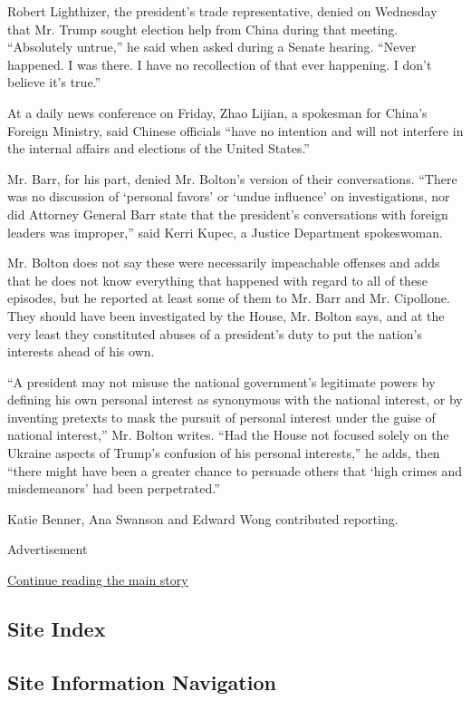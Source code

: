 Robert Lighthizer, the president's trade representative, denied on
Wednesday that Mr. Trump sought election help from China during that
meeting. ``Absolutely untrue,'' he said when asked during a Senate
hearing. ``Never happened. I was there. I have no recollection of that
ever happening. I don't believe it's true.''

At a daily news conference on Friday, Zhao Lijian, a spokesman for
China's Foreign Ministry, said Chinese officials ``have no intention and
will not interfere in the internal affairs and elections of the United
States.''

Mr. Barr, for his part, denied Mr. Bolton's version of their
conversations. ``There was no discussion of `personal favors' or `undue
influence' on investigations, nor did Attorney General Barr state that
the president's conversations with foreign leaders was improper,'' said
Kerri Kupec, a Justice Department spokeswoman.

Mr. Bolton does not say these were necessarily impeachable offenses and
adds that he does not know everything that happened with regard to all
of these episodes, but he reported at least some of them to Mr. Barr and
Mr. Cipollone. They should have been investigated by the House, Mr.
Bolton says, and at the very least they constituted abuses of a
president's duty to put the nation's interests ahead of his own.

``A president may not misuse the national government's legitimate powers
by defining his own personal interest as synonymous with the national
interest, or by inventing pretexts to mask the pursuit of personal
interest under the guise of national interest,'' Mr. Bolton writes.
``Had the House not focused solely on the Ukraine aspects of Trump's
confusion of his personal interests,'' he adds, then ``there might have
been a greater chance to persuade others that `high crimes and
misdemeanors' had been perpetrated.''

Katie Benner, Ana Swanson and Edward Wong contributed reporting.

Advertisement

\protect\hyperlink{after-bottom}{Continue reading the main story}

\hypertarget{site-index}{%
\subsection{Site Index}\label{site-index}}

\hypertarget{site-information-navigation}{%
\subsection{Site Information
Navigation}\label{site-information-navigation}}

